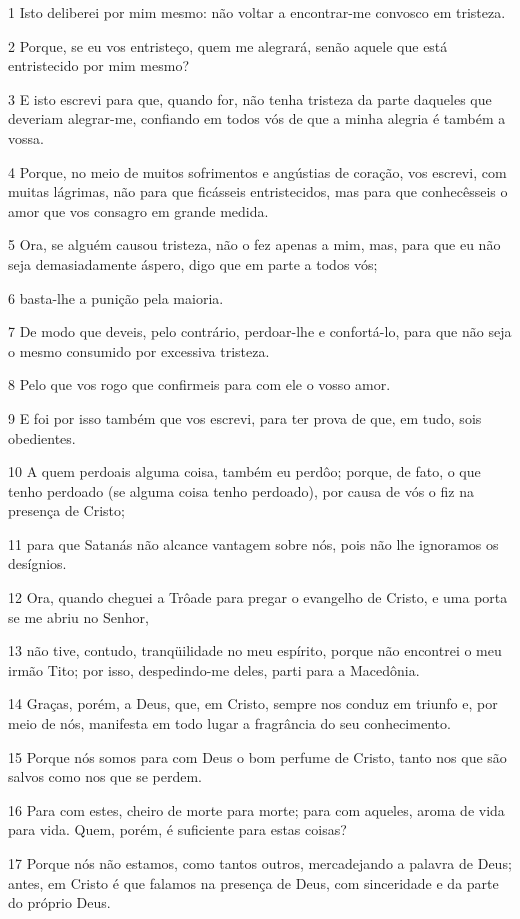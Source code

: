 \par 1 Isto deliberei por mim mesmo: não voltar a encontrar-me convosco em tristeza.
\par 2 Porque, se eu vos entristeço, quem me alegrará, senão aquele que está entristecido por mim mesmo?
\par 3 E isto escrevi para que, quando for, não tenha tristeza da parte daqueles que deveriam alegrar-me, confiando em todos vós de que a minha alegria é também a vossa.
\par 4 Porque, no meio de muitos sofrimentos e angústias de coração, vos escrevi, com muitas lágrimas, não para que ficásseis entristecidos, mas para que conhecêsseis o amor que vos consagro em grande medida.
\par 5 Ora, se alguém causou tristeza, não o fez apenas a mim, mas, para que eu não seja demasiadamente áspero, digo que em parte a todos vós;
\par 6 basta-lhe a punição pela maioria.
\par 7 De modo que deveis, pelo contrário, perdoar-lhe e confortá-lo, para que não seja o mesmo consumido por excessiva tristeza.
\par 8 Pelo que vos rogo que confirmeis para com ele o vosso amor.
\par 9 E foi por isso também que vos escrevi, para ter prova de que, em tudo, sois obedientes.
\par 10 A quem perdoais alguma coisa, também eu perdôo; porque, de fato, o que tenho perdoado (se alguma coisa tenho perdoado), por causa de vós o fiz na presença de Cristo;
\par 11 para que Satanás não alcance vantagem sobre nós, pois não lhe ignoramos os desígnios.
\par 12 Ora, quando cheguei a Trôade para pregar o evangelho de Cristo, e uma porta se me abriu no Senhor,
\par 13 não tive, contudo, tranqüilidade no meu espírito, porque não encontrei o meu irmão Tito; por isso, despedindo-me deles, parti para a Macedônia.
\par 14 Graças, porém, a Deus, que, em Cristo, sempre nos conduz em triunfo e, por meio de nós, manifesta em todo lugar a fragrância do seu conhecimento.
\par 15 Porque nós somos para com Deus o bom perfume de Cristo, tanto nos que são salvos como nos que se perdem.
\par 16 Para com estes, cheiro de morte para morte; para com aqueles, aroma de vida para vida. Quem, porém, é suficiente para estas coisas?
\par 17 Porque nós não estamos, como tantos outros, mercadejando a palavra de Deus; antes, em Cristo é que falamos na presença de Deus, com sinceridade e da parte do próprio Deus.


